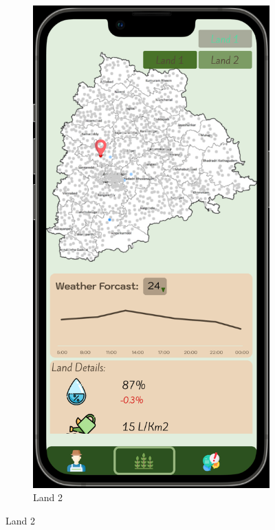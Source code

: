 \begin{figure}[ht]
\begin{subfigure}[b]{0.6\linewidth}
    \includegraphics[width=0.8\linewidth]{figures/chooseLand2.png} 
    \caption{Land 2} 
    \label{fig:b} 
    \vspace{4ex}
  \end{subfigure} 
  
  \label{fig:example_many_images} 
\end{figure}


